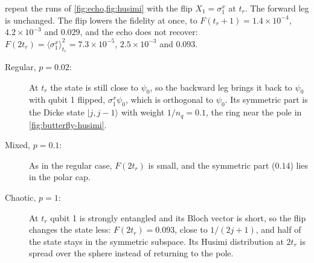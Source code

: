 \documentclass[11pt,a4paper]{article}
\begin{document}
 repeat the runs of \cref{fig:echo,fig:husimi} with the flip
$X_1=\sigma^x_1$ at $t_r$. The forward leg is unchanged. The flip lowers the fidelity at once, to $F(t_r+1)=1.4\times
10^{-4}$, $4.2\times10^{-3}$ and $0.029$, and the echo does not recover: $F(2t_r)=\langle\sigma^x_1\rangle_{t_r}^2=7.3
\times10^{-5}$, $2.5\times10^{-3}$ and $0.093$.
\begin{description}
\item[Regular, $p=0.02$:] At $t_r$ the state is still close to $\psi_0$, so the backward leg brings it back to $\psi_0$
  with qubit 1 flipped, $\sigma^x_1\psi_0$, which is orthogonal to $\psi_0$. Its symmetric part is the Dicke state
  $|j,j-1\rangle$ with weight $1/n_q=0.1$, the ring near the pole in \cref{fig:butterfly-husimi}.
\item[Mixed, $p=0.1$:] As in the regular case, $F(2t_r)$ is small, and the symmetric part ($0.14$) lies in the polar
  cap.
\item[Chaotic, $p=1$:] At $t_r$ qubit 1 is strongly entangled and its Bloch vector is short, so the flip changes the
  state less: $F(2t_r)=0.093$, close to $1/(2j+1)$, and half of the state stays in the symmetric subspace. Its Husimi
  distribution at $2t_r$ is spread over the sphere instead of returning to the pole.
\end{description}
\end{document}
